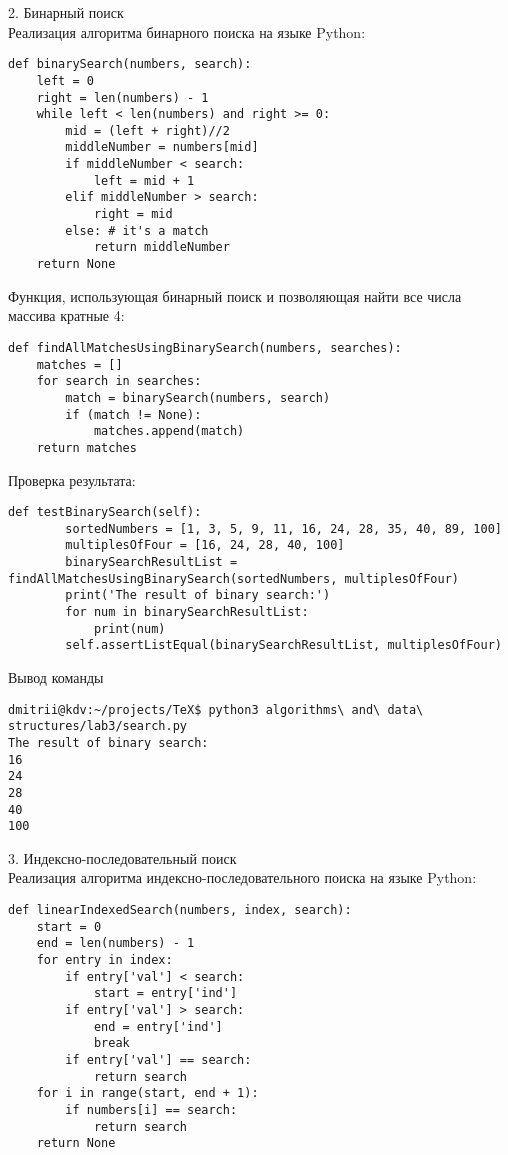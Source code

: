 \documentclass[12pt]{article}
\begin{document}
2. Бинарный поиск\\
Реализация алгоритма бинарного поиска на языке Python:
\begin{verbatim}
def binarySearch(numbers, search):
	left = 0
	right = len(numbers) - 1
	while left < len(numbers) and right >= 0:
		mid = (left + right)//2
		middleNumber = numbers[mid]
		if middleNumber < search:
			left = mid + 1
		elif middleNumber > search:
			right = mid
		else: # it's a match
			return middleNumber
	return None
\end{verbatim}

Функция, использующая бинарный поиск и позволяющая найти все числа массива кратные 4:
\begin{verbatim}
def findAllMatchesUsingBinarySearch(numbers, searches):
	matches = []
	for search in searches:
		match = binarySearch(numbers, search)
		if (match != None):
			matches.append(match)
	return matches
\end{verbatim}
Проверка результата:
\begin{verbatim}
def testBinarySearch(self):
		sortedNumbers = [1, 3, 5, 9, 11, 16, 24, 28, 35, 40, 89, 100]
		multiplesOfFour = [16, 24, 28, 40, 100]
		binarySearchResultList = findAllMatchesUsingBinarySearch(sortedNumbers, multiplesOfFour)
		print('The result of binary search:')
		for num in binarySearchResultList:
			print(num)
		self.assertListEqual(binarySearchResultList, multiplesOfFour)
\end{verbatim}

Вывод команды
\begin{verbatim}
dmitrii@kdv:~/projects/TeX$ python3 algorithms\ and\ data\ structures/lab3/search.py 
The result of binary search:
16
24
28
40
100
\end{verbatim}

3. Индексно-последовательный поиск\\
Реализация алгоритма индексно-последовательного поиска на языке Python:
\begin{verbatim}
def linearIndexedSearch(numbers, index, search):
	start = 0
	end = len(numbers) - 1
	for entry in index:
		if entry['val'] < search:
			start = entry['ind']
		if entry['val'] > search:
			end = entry['ind']
			break
		if entry['val'] == search:
			return search
	for i in range(start, end + 1):
		if numbers[i] == search:
			return search
	return None
\end{verbatim}
\end{document}
